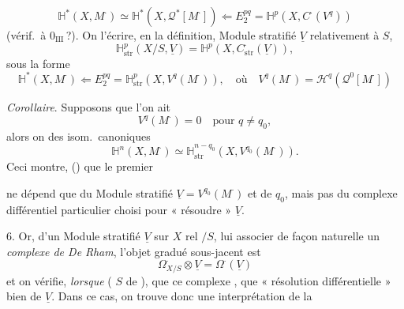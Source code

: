 \documentclass[11pt,a4paper]{article}
\begin{document}

\[
  \mathbb{H}^{*}(X, M^{\cdot}) \simeq \mathbb{H}^{*}(X, \mathcal{Q}^{*}[M^{\cdot}])
  \Longleftarrow E_2^{pq} = \mathbb{H}^{p}(X, C^{\cdot}(V^{q}))
\]
(vérif.\ à  $0_{\mathrm{III}}$\,?). On \ill{} \ill{}
l'écrire, en \ill{} la définition, \ill{} \ill{} Module stratifié
$\underline{V}$ relativement à $S$,
\[
  \mathbb{H}^{p}_{\mathrm{str}}(X/S, \underline{V})
  = \mathbb{H}^{p}(X, C^{\cdot}_{\mathrm{str}}(\underline{V})) ,
\]
sous la forme
\[
  \boxed{\;
  \mathbb{H}^{*}(X, M^{\cdot}) \Longleftarrow
  E_2^{pq} = \mathbb{H}^{p}_{\mathrm{str}}(X, V^{q}(M^{\cdot})),
  \quad\text{où}\quad
  V^{q}(M^{\cdot}) = \mathcal{H}^{q}(\mathcal{Q}^{0}[M^{\cdot}])
  \;}
\]

\emph{Corollaire}. Supposons que l'on ait
\[
  V^{q}(M^{\cdot}) = 0 \quad \text{pour } q \neq q_0 ,
\]
alors on \ill{} \ill{} des isom.\ canoniques
\[
  \mathbb{H}^{n}(X, M^{\cdot}) \simeq
  \mathbb{H}^{n-q_0}_{\mathrm{str}}(X, V^{q_0}(M^{\cdot})) .
\]
Ceci montre, () que le premier \ill{}


ne dépend que du Module stratifié $\underline{V} = V^{q_0}(M^{\cdot})$ et de
\struck{\ill{}} $q_0$, mais pas du complexe différentiel particulier choisi
pour « résoudre » $\underline{V}$.

6. Or, \struck{\ill{}}  \ill{} \struck{\ill{}} \ill{} \ill{}
\ill{} d'un Module stratifié $\underline{V}$ sur $X$ rel $/S$, \ill{}
\ill{} \ill{} lui associer de façon naturelle un \emph{complexe de De Rham},
\ill{} \ill{} l'objet gradué sous-jacent est
\[
  \Omega^{\cdot}_{X/S} \otimes \underline{V} = \Omega^{\cdot}(\underline{V})
\]
et on vérifie, \emph{lorsque} ( $S$ \ill{} de
\emph{\ill{}}), que ce
complexe \emph{\ill{}}, que \ill{} \ill{} « résolution différentielle » \ill{}
bien \ill{} de $\underline{V}$. Dans ce cas, on trouve donc une
interprétation \ill{} de la

\end{document}
